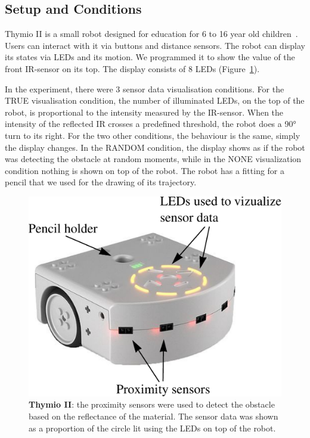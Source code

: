 \documentclass{sig-alternate}
\begin{document}
\subsection{Setup and Conditions}

Thymio II is a small robot designed for education for 6 to 16 year old
children~\cite{magnenat2012programming, riedo2012two}. Users can interact with
it via buttons and distance sensors. The robot can display its states via 
LEDs and its motion. We programmed it to show the value of the front IR-sensor
on its top. The display consists of 8 LEDs (Figure~\ref{thymio}).

In the experiment, there were 3 sensor data visualisation conditions.  For the
{\sf TRUE} visualisation condition, the number of illuminated LEDs, on the top of the
robot, is proportional to the intensity measured by the IR-sensor. When the
intensity of the reflected IR crosses a predefined threshold, the robot does a
90° turn to its right. For the two other conditions, the behaviour is the same,
simply the display changes. In the {\sf RANDOM} condition, the display shows as if the
robot was detecting the obstacle at random moments, while in the {\sf NONE}
visualization condition nothing is shown on top of the robot. The robot has a
fitting for a pencil that we used for the drawing of its trajectory.

\begin{figure}
    \centering
    \includegraphics[width=0.9\linewidth]{thymio}
    \caption{\small \textbf{Thymio II}: the proximity sensors were used to
    detect the obstacle based on the reflectance of the material. The sensor
    data was shown as a proportion of the circle lit using the LEDs on top of the
    robot.}

    \label{thymio}
\end{figure}
\end{document}

